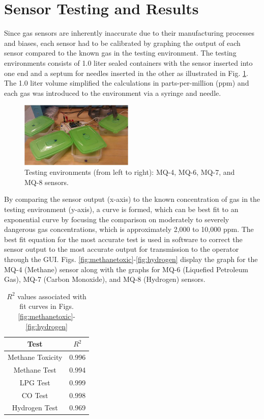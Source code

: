 \section{Sensor Testing and Results}\label{sec:results}

Since gas sensors are inherently inaccurate due to their manufacturing processes and biases, each sensor had to be calibrated by graphing the output of each sensor compared to the known gas in the testing environment. The testing environments consists of 1.0 liter sealed containers with the sensor inserted into one end and a septum for needles inserted in the other as illustrated in Fig. \ref{fig:sensor}. The 1.0 liter volume simplified the calculations in parts-per-million (ppm) and each gas was introduced to the environment via a syringe and needle.

\begin{figure}
	\centering
	\includegraphics[width=0.48\textwidth]{./pictures/sensor.jpg}
	\caption{Testing environments (from left to right): MQ-4, MQ-6, MQ-7, and MQ-8 sensors.}
	\label{fig:sensor}
\end{figure}

By comparing the sensor output (x-axis) to the known concentration of gas in the testing environment (y-axis), a curve is formed, which can be best fit to an exponential curve by focusing the comparison on moderately to severely dangerous gas concentrations, which is approximately 2,000 to 10,000 ppm. The best fit equation for the most accurate test is used in software to correct the sensor output to the most accurate output for transmission to the operator through the GUI. Figs. \ref{fig:methanetoxic}-\ref{fig:hydrogen} display the graph for the MQ-4 (Methane) sensor along with the graphs for MQ-6 (Liquefied Petroleum Gas), MQ-7 (Carbon Monoxide), and MQ-8 (Hydrogen) sensors.

\begin{table}
	\centering
	\begin{tabular}{|c|c|}
		\hline
		Test & \(R^2\) \\ \hline
		Methane Toxicity & 0.996 \\ \hline
		Methane Test & 0.994 \\ \hline
		LPG Test & 0.999 \\ \hline
		CO Test & 0.998 \\ \hline
		Hydrogen Test & 0.969 \\ \hline
	\end{tabular}
	\caption{\(R^2\) values associated with fit curves in Figs. \ref{fig:methanetoxic}-\ref{fig:hydrogen}}
\end{table}

